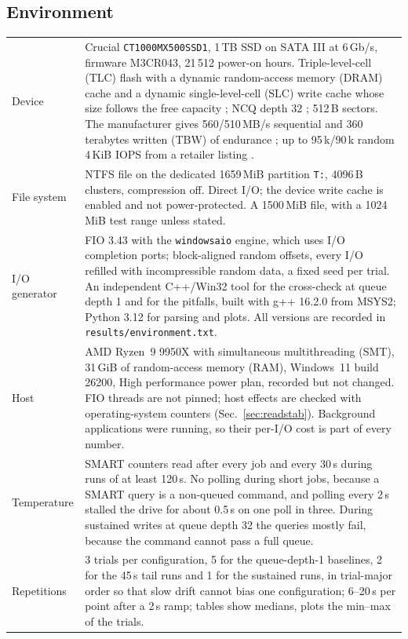 \documentclass{article}
\begin{document}
\subsection{Environment}\label{sec:env}
{\small
\begin{longtable}{p{2.6cm}p{13.4cm}}
\toprule
Device & Crucial \texttt{CT1000MX500SSD1}, 1\,TB SSD on SATA III at 6\,Gb/s, firmware M3CR043, 21\,512 power-on hours. Triple-level-cell (TLC) flash with a dynamic random-access memory (DRAM) cache and a dynamic single-level-cell (SLC) write cache whose size follows the free capacity \cite{computerbase}; NCQ depth 32 \cite{ncq}; 512\,B sectors. The manufacturer gives 560/510\,MB/s sequential and 360 terabytes written (TBW) of endurance \cite{ocinside}; up to 95\,k/90\,k random 4\,KiB IOPS from a retailer listing \cite{geektopia}. \\
File system & NTFS file on the dedicated 1659\,MiB partition \texttt{T:}, 4096\,B clusters, compression off. Direct I/O; the device write cache is enabled and not power-protected. A 1500\,MiB file, with a 1024\,MiB test range unless stated. \\
I/O generator & FIO 3.43 with the \texttt{windowsaio} engine, which uses I/O completion ports; block-aligned random offsets, every I/O refilled with incompressible random data, a fixed seed per trial. An independent C++/Win32 tool for the cross-check at queue depth 1 and for the pitfalls, built with g++ 16.2.0 from MSYS2; Python 3.12 for parsing and plots. All versions are recorded in \texttt{results/environment.txt}. \\
Host & AMD Ryzen~9 9950X with simultaneous multithreading (SMT), 31\,GiB of random-access memory (RAM), Windows~11 build 26200, High performance power plan, recorded but not changed. FIO threads are not pinned; host effects are checked with operating-system counters (Sec.~\ref{sec:readstab}). Background applications were running, so their per-I/O cost is part of every number.\\
Temperature & SMART counters \cite{msstorrel} read after every job and every 30\,s during runs of at least 120\,s. No polling during short jobs, because a SMART query is a non-queued command, and polling every 2\,s stalled the drive for about 0.5\,s on one poll in three. During sustained writes at queue depth 32 the queries mostly fail, because the command cannot pass a full queue. \\
Repetitions & 3 trials per configuration, 5 for the queue-depth-1 baselines, 2 for the 45\,s tail runs and 1 for the sustained runs, in trial-major order so that slow drift cannot bias one configuration; 6--20\,s per point after a 2\,s ramp; tables show medians, plots the min--max of the trials. \\
\bottomrule
\end{longtable}
}
\end{document}
